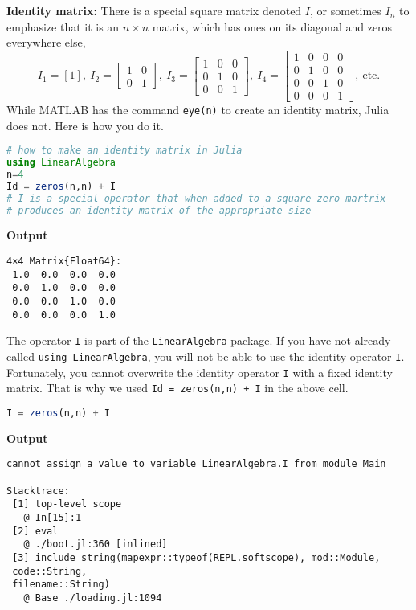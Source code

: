 \textbf{Identity matrix:} There is a special square matrix denoted $I$, or sometimes $I_n$ to emphasize that it is an $n \times n $ matrix, which has ones on its diagonal and zeros everywhere else,
$$I_1=[1],~I_2=\begin{bmatrix} 1 & 0\\0& 1 \end{bmatrix},~I_3= \begin{bmatrix} 1 & 0 & 0\\0& 1 & 0\\ 0 & 0 & 1 \end{bmatrix}, ~I_4=\begin{bmatrix} 1 & 0 & 0 & 0\\0& 1 & 0 & 0\\ 0 & 0 & 1 & 0 \\ 0 & 0& 0& 1\end{bmatrix}, ~\text{etc.} $$ 
While MATLAB has the command \texttt{eye(n)} to create an identity matrix, Julia does not. Here is how you do it.

\begin{lstlisting}[language=Julia,style=mystyle]
# how to make an identity matrix in Julia
using LinearAlgebra
n=4
Id = zeros(n,n) + I
# I is a special operator that when added to a square zero martrix 
# produces an identity matrix of the appropriate size
\end{lstlisting}
\textbf{Output} 
\begin{verbatim}
4×4 Matrix{Float64}:
 1.0  0.0  0.0  0.0
 0.0  1.0  0.0  0.0
 0.0  0.0  1.0  0.0
 0.0  0.0  0.0  1.0
\end{verbatim}

The operator \texttt{I} is part of the \texttt{LinearAlgebra} package. If you have not already called \texttt{using LinearAlgebra}, you will not be able to use the identity operator \texttt{I}. \\

Fortunately, you cannot overwrite the identity operator \texttt{I} with a fixed identity matrix. That is why we used \texttt{Id = zeros(n,n) + I} in the above cell.\\

\begin{lstlisting}[language=Julia,style=mystyle]
I = zeros(n,n) + I
\end{lstlisting}
\textbf{Output} 
\begin{verbatim}
cannot assign a value to variable LinearAlgebra.I from module Main

Stacktrace:
 [1] top-level scope
   @ In[15]:1
 [2] eval
   @ ./boot.jl:360 [inlined]
 [3] include_string(mapexpr::typeof(REPL.softscope), mod::Module, 
 code::String,
 filename::String)
   @ Base ./loading.jl:1094
\end{verbatim}

